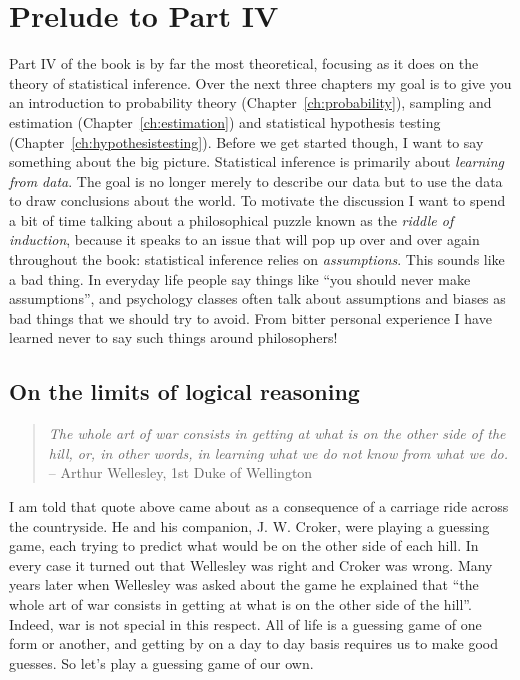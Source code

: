 
\chapter*{Prelude to Part IV}

\noindent
Part IV of the book is by far the most theoretical, focusing as it does on the theory of statistical inference. Over the next three chapters my goal is to give you an introduction to probability theory (Chapter~\ref{ch:probability}), sampling and estimation (Chapter~\ref{ch:estimation}) and statistical hypothesis testing (Chapter~\ref{ch:hypothesistesting}). Before we get started though, I want to say something about the big picture. Statistical inference is primarily about {\it learning from data}. The goal is no longer merely to describe our data but to use the data to draw conclusions about the world. To motivate the discussion I want to spend a bit of time talking about a philosophical puzzle known as the {\it riddle of induction}, because it speaks to an issue that will pop up over and over again throughout the book: statistical inference relies on {\it assumptions}. This sounds like a bad thing. In everyday life people say things like ``you should never make assumptions'', and psychology classes often talk about assumptions and biases as bad things that we should try to avoid. From bitter personal experience I have learned never to say such things around philosophers! 

\section*{On the limits of logical reasoning}

\begin{quote}
{\it The whole art of war consists in getting at what is on the other side of the hill, or, in other words, in learning what we do not know from what we do.} \\
\hspace*{2cm} -- Arthur Wellesley, 1st Duke of Wellington
\end{quote}

I am told that quote above came about as a consequence of a carriage ride across the countryside. He and his companion, J. W. Croker, were playing a guessing game, each trying to predict what would be on the other side of each hill. In every case it turned out that Wellesley was right and Croker was wrong. Many years later when Wellesley was asked about the game he explained that ``the whole art of war consists in getting at what is on the other side of the hill''. Indeed, war is not special in this respect. All of life is a guessing game of one form or another, and getting by on a day to day basis requires us to make good guesses. So let's play a guessing game of our own. 

